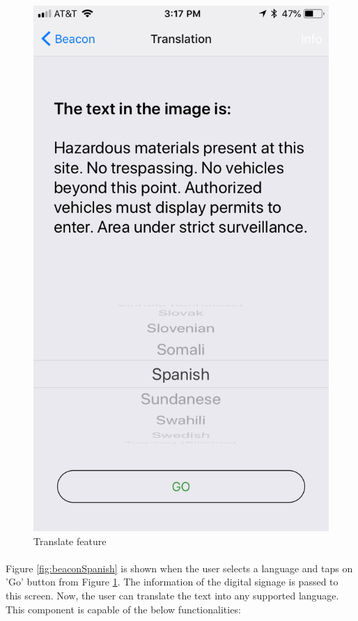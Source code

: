 \documentclass[12pt]{article}
\begin{document}
\begin{figure} [H]
\begin{minipage}{.5\textwidth}
  \includegraphics[width=0.9\linewidth]{media/beacon2.PNG}
  \caption{Translate feature}
  \label{fig:beaconTranslate}
\end{minipage}
\end{figure}


\paragraph{}Figure \ref{fig:beaconSpanish} is shown when the user selects a language and taps on 'Go' button from Figure \ref{fig:beaconTranslate}. The information of the digital signage is passed to this screen. Now, the user can translate the text into any supported language. This component is capable of the below functionalities:
\end{document}
